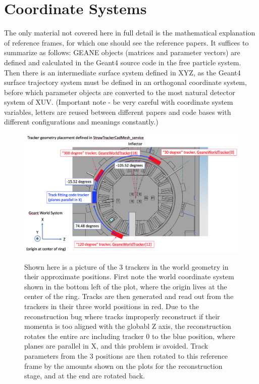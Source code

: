 \documentclass{article}
\begin{document}
\section{Coordinate Systems}

  The only material not covered here in full detail is the mathematical explanation of reference frames, for which one should see the reference papers. It suffices to summarize as follows: GEANE objects (matrices and parameter vectors) are defined and calculated in the Geant4 source code in the free particle system. Then there is an intermediate surface system defined in XYZ, as the Geant4 surface trajectory system must be defined in an orthogonal coordinate system, before which parameter objects are converted to the most natural detector system of XUV. (Important note - be very careful with coordinate system variables, letters are reused between different papers and code bases with different configurations and meanings constantly.)


\begin{figure}[]
\caption{Shown here is a picture of the 3 trackers in the world geometry in their approximate positions. First note the world coordinate system shown in the bottom left of the plot, where the origin lives at the center of the ring. Tracks are then generated and read out from the trackers in their three world positions in red. Due to the reconstruction bug where tracks improperly reconstruct if their momenta is too aligned with the globabl Z axis, the reconstruction rotates the entire arc including tracker 0 to the blue position, where planes are parallel in X, and this problem is avoided. Track parameters from the 3 positions are then rotated to this reference frame by the amounts shown on the plots for the reconstruction stage, and at the end are rotated back.}
\centering
\includegraphics[width=1.0\textwidth]{WorldCoordSys}
\label{fig:WorldCoordSys}
\end{figure}
\end{document}
